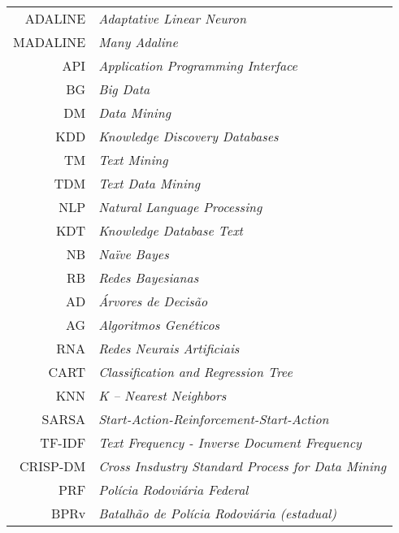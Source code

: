 \vspace*{12pt}

\noindent

\vspace{1em}

\begin{tabular}{r  l}
 ADALINE & \textit{Adaptative Linear Neuron}\\
 MADALINE & \textit{Many Adaline}\\
 API & \textit{Application Programming Interface}\\
 BG & \textit{Big Data}\\
 DM & \textit{Data Mining}\\
 KDD & \textit{Knowledge Discovery Databases}\\
 TM & \textit{Text Mining} \\
 TDM & \textit{Text Data Mining}\\
 NLP & \textit{Natural Language Processing}\\
 KDT & \textit{Knowledge Database Text}\\
 NB & \textit{Naïve Bayes}\\
 RB & \textit{Redes Bayesianas}\\
 AD & \textit{Árvores de Decisão}\\
 AG & \textit{Algoritmos Genéticos}\\
 RNA & \textit{Redes Neurais Artificiais}\\
 CART & \textit{Classification and Regression Tree}\\ 
 KNN & \textit{K -- Nearest Neighbors }\\
 SARSA & \textit{Start-Action-Reinforcement-Start-Action}\\
 TF-IDF & \textit{Text Frequency - Inverse Document Frequency} \\
 CRISP-DM & \textit{Cross Insdustry Standard Process for Data Mining}\\
 PRF & \textit{Polícia Rodoviária Federal}\\
 BPRv & \textit{Batalhão de Polícia Rodoviária (estadual)}\\


 
\end{tabular}


